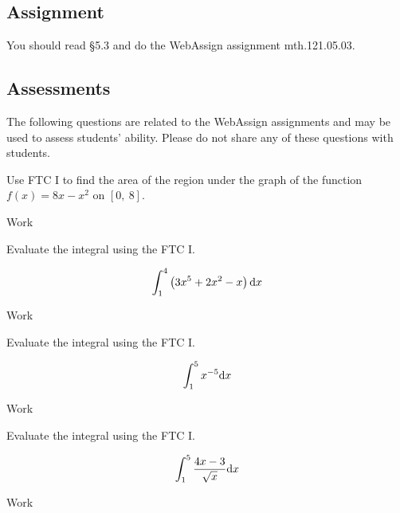 \documentclass[12pt,addpoints, answers, fleqn]{exam}
\begin{document}
\subsection{Assignment}
You should read \S  5.3 and do the WebAssign assignment mth.121.05.03.
\vfill
\pagebreak
\begin{teacher}
\subsection{Assessments}
The following questions are related to the WebAssign assignments and may be used to assess students' ability. Please do not share any of these questions with students.
\begin{questions}	
\question 	%

Use FTC I to find the area of the region under the graph of the function 
$f\left(x\right) = 8x -x^2$ on $\left[0,\ 8\right]$.
 \begin{solution}
 Work
 \end{solution}
 
 
\question 	%

Evaluate the integral using the FTC I.

\[
\int_1^4 \left( 3x^5 + 2x^2 - x\right) {\rm{d}}x
\]

 \begin{solution}
 Work
 \end{solution}
 
\question 	%

Evaluate the integral using the FTC I.

\[
\int_1^5 x^{-5} {\rm{d}}x
\]

 \begin{solution}
 Work
 \end{solution}
 
\question 	%

Evaluate the integral using the FTC I.

\[
\int_1^5 \frac{4x-3}{\sqrt{x}} {\rm{d}}x
\]

 \begin{solution}
 Work
 \end{solution}
 
\question 	%


\end{questions}
\end{teacher}
\end{document}
